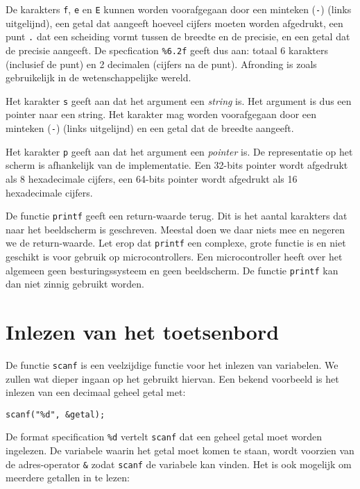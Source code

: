 De karakters \texttt{f}, \texttt{e} en \texttt{E} kunnen worden voorafgegaan door een minteken (\texttt{-}) (links uitgelijnd), een getal dat aangeeft hoeveel cijfers moeten worden afgedrukt, een punt \texttt{\texttt{.}} dat een scheiding vormt tussen de breedte en de precisie, en een getal dat de precisie aangeeft. De specfication \texttt{\%6.2f} geeft dus aan: totaal 6 karakters (inclusief de punt) en 2 decimalen (cijfers na de punt). Afronding is zoals gebruikelijk in de wetenschappelijke wereld.

Het karakter \texttt{s} geeft aan dat het argument een \textsl{string} is. Het argument is dus een pointer naar een string. Het karakter mag worden voorafgegaan door een minteken (\texttt{-}) (links uitgelijnd) en een getal dat de breedte aangeeft.

Het karakter \texttt{p} geeft aan dat het argument een \textsl{pointer} is. De representatie op het scherm is afhankelijk van de implementatie. Een 32-bits pointer wordt afgedrukt als 8 hexadecimale cijfers, een 64-bits pointer wordt afgedrukt als 16 hexadecimale cijfers.

De functie \texttt{printf} geeft een return-waarde terug. Dit is het aantal karakters dat naar het beeldscherm is geschreven. Meestal doen we daar niets mee en negeren we de return-waarde.
Let erop dat \texttt{printf} een complexe, grote functie is en niet geschikt is voor gebruik op microcontrollers. Een microcontroller heeft over het algemeen geen besturingssysteem en geen beeldscherm. De functie \texttt{printf} kan dan niet zinnig gebruikt worden.


\section{Inlezen van het toetsenbord}
\label{sec:scanf}
De functie \texttt{scanf} is een veelzijdige functie voor het inlezen van variabelen. We zullen wat dieper ingaan op het gebruikt hiervan. Een bekend voorbeeld is het inlezen van een decimaal geheel getal met:

\hspace*{1em}\texttt{scanf("\%d", \&getal);}

De format specification \texttt{\%d} vertelt \texttt{scanf} dat een geheel getal moet worden ingelezen. De variabele waarin het getal moet komen te staan, wordt voorzien van de adres-operator \texttt{\&} zodat \texttt{scanf} de variabele kan vinden.
Het is ook mogelijk om meerdere getallen in te lezen:

